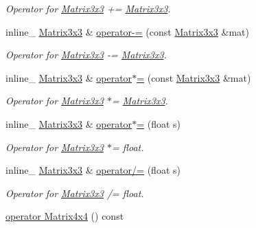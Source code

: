 \begin{DoxyCompactItemize}
\begin{DoxyCompactList}\small\item\em Operator for \hyperlink{classMatrix3x3}{Matrix3x3} += \hyperlink{classMatrix3x3}{Matrix3x3}. \end{DoxyCompactList}\item 
inline\+\_\+ \hyperlink{classMatrix3x3}{Matrix3x3} \& \hyperlink{classMatrix3x3_a787a01c0e7b22160992a99c4a7cf8cfe}{operator-\/=} (const \hyperlink{classMatrix3x3}{Matrix3x3} \&mat)\hypertarget{classMatrix3x3_a787a01c0e7b22160992a99c4a7cf8cfe}{}\label{classMatrix3x3_a787a01c0e7b22160992a99c4a7cf8cfe}

\begin{DoxyCompactList}\small\item\em Operator for \hyperlink{classMatrix3x3}{Matrix3x3} -\/= \hyperlink{classMatrix3x3}{Matrix3x3}. \end{DoxyCompactList}\item 
inline\+\_\+ \hyperlink{classMatrix3x3}{Matrix3x3} \& \hyperlink{classMatrix3x3_a0b111cd6ad50d5521b5ea1d8b1e6a2a3}{operator$\ast$=} (const \hyperlink{classMatrix3x3}{Matrix3x3} \&mat)\hypertarget{classMatrix3x3_a0b111cd6ad50d5521b5ea1d8b1e6a2a3}{}\label{classMatrix3x3_a0b111cd6ad50d5521b5ea1d8b1e6a2a3}

\begin{DoxyCompactList}\small\item\em Operator for \hyperlink{classMatrix3x3}{Matrix3x3} $\ast$= \hyperlink{classMatrix3x3}{Matrix3x3}. \end{DoxyCompactList}\item 
inline\+\_\+ \hyperlink{classMatrix3x3}{Matrix3x3} \& \hyperlink{classMatrix3x3_a3762041f07d0b9e7100b44f3220822c4}{operator$\ast$=} (float s)\hypertarget{classMatrix3x3_a3762041f07d0b9e7100b44f3220822c4}{}\label{classMatrix3x3_a3762041f07d0b9e7100b44f3220822c4}

\begin{DoxyCompactList}\small\item\em Operator for \hyperlink{classMatrix3x3}{Matrix3x3} $\ast$= float. \end{DoxyCompactList}\item 
inline\+\_\+ \hyperlink{classMatrix3x3}{Matrix3x3} \& \hyperlink{classMatrix3x3_ac60380215cd70ecb2445498901241d76}{operator/=} (float s)\hypertarget{classMatrix3x3_ac60380215cd70ecb2445498901241d76}{}\label{classMatrix3x3_ac60380215cd70ecb2445498901241d76}

\begin{DoxyCompactList}\small\item\em Operator for \hyperlink{classMatrix3x3}{Matrix3x3} /= float. \end{DoxyCompactList}\item 
\hyperlink{classMatrix3x3_a6c18a333c52912661fe2017a882b9b4f}{operator Matrix4x4} () const \hypertarget{classMatrix3x3_a6c18a333c52912661fe2017a882b9b4f}{}\label{classMatrix3x3_a6c18a333c52912661fe2017a882b9b4f}


\end{DoxyCompactItemize}
